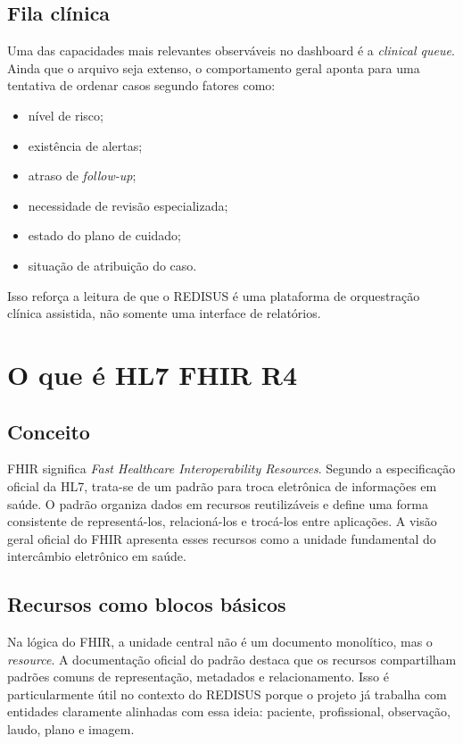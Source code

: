 \documentclass[
    12pt,
    openright,
    oneside,
    a4paper,
    chapter=TITLE,
    section=TITLE,
    brazil,
    sumario=tradicional,
    hidelinks
]{abntex2}
\begin{document}
\section{Fila cl\'inica}

Uma das capacidades mais relevantes observ\'aveis no dashboard \'e a \textit{clinical queue}. Ainda que o arquivo seja extenso, o comportamento geral aponta para uma tentativa de ordenar casos segundo fatores como:

\begin{itemize}
    \item n\'ivel de risco;
    \item exist\^encia de alertas;
    \item atraso de \textit{follow-up};
    \item necessidade de revis\~ao especializada;
    \item estado do plano de cuidado;
    \item situa\c{c}\~ao de atribui\c{c}\~ao do caso.
\end{itemize}

Isso refor\c{c}a a leitura de que o REDISUS \'e uma plataforma de orquestra\c{c}\~ao cl\'inica assistida, n\~ao somente uma interface de relat\'orios.

\chapter{O que \'e HL7 FHIR R4}

\section{Conceito}

FHIR significa \textit{Fast Healthcare Interoperability Resources}. Segundo a especifica\c{c}\~ao oficial da HL7, trata-se de um padr\~ao para troca eletr\^onica de informa\c{c}\~oes em sa\'ude. O padr\~ao organiza dados em recursos reutiliz\'aveis e define uma forma consistente de represent\'a-los, relacion\'a-los e troc\'a-los entre aplica\c{c}\~oes. A vis\~ao geral oficial do FHIR apresenta esses recursos como a unidade fundamental do interc\^ambio eletr\^onico em sa\'ude.

\section{Recursos como blocos b\'asicos}

Na l\'ogica do FHIR, a unidade central n\~ao \'e um documento monol\'itico, mas o \textit{resource}. A documenta\c{c}\~ao oficial do padr\~ao destaca que os recursos compartilham padr\~oes comuns de representa\c{c}\~ao, metadados e relacionamento. Isso \'e particularmente \'util no contexto do REDISUS porque o projeto j\'a trabalha com entidades claramente alinhadas com essa ideia: paciente, profissional, observa\c{c}\~ao, laudo, plano e imagem.
\end{document}
